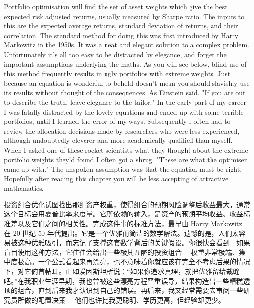 

\begin{englishblock} Portfolio optimisation will find the set of asset weights which give the best expected risk adjusted returns, usually measured by Sharpe ratio. The inputs to this are the expected average returns, standard deviation of returns, and their correlation. The standard method for doing this was first introduced by Harry Markowitz in the 1950s. It was a neat and elegant solution to a complex problem. Unfortunately it's all too easy to be distracted by elegance, and forget the important assumptions underlying the maths. As you will see below, blind use of this method frequently results in ugly portfolios with extreme weights. Just because an equation is wonderful to behold doesn't mean you should slavishly use its results without thought of the consequences. As Einstein said, "If you are out to describe the truth, leave elegance to the tailor." In the early part of my career I was fatally distracted by the lovely equations and ended up with some terrible portfolios, until I learned the error of my ways. Subsequently I often had to review the allocation decisions made by researchers who were less experienced, although undoubtedly cleverer and more academically qualified than myself. When I asked one of these rocket scientists what they thought about the extreme portfolio weights they'd found I often got a shrug. "These are what the optimiser came up with." The unspoken assumption was that the equation must be right. Hopefully after reading this chapter you will be less accepting of attractive mathematics. \end{englishblock}

\begin{chineseblock}投资组合优化试图找出那组资产权重，使得组合的预期风险调整后收益最大，通常这个目标会用夏普比率来度量。它所依赖的输入，是资产的预期平均收益、收益标准差以及它们之间的相关性。完成这件事的标准方法，最早由 Harry Markowitz 在 20 世纪 50 年代提出。它是一个优雅而简洁的数学解法。遗憾的是，人们太容易被这种优雅吸引，而忘记了支撑这套数学背后的关键假设。你很快会看到：如果盲目使用这种方法，它往往会给出一些极其丑陋的投资组合--- 权重非常极端、集中度极高。一个公式看起来再漂亮，也不意味着你就应该在完全不考虑后果的情况下，对它俯首帖耳。正如爱因斯坦所说：“如果你追求真理，就把优雅留给裁缝吧。”在我职业生涯早期，我也曾被这些漂亮方程严重误导，结果构造出一些糟糕透顶的组合，直到后来我才认识到自己的错误。再后来，我又经常需要去审阅一些研究员所做的配置决策--- 他们也许比我更聪明、学历更高，但经验却更少。\end{chineseblock}

